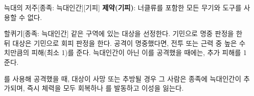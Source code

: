 \documentclass{report}
\begin{document}
	\begin{story}{늑대의 저주}{[종족: 늑대인간][기피]}
		\textbf{제약(기피)}: 너클류를 포함한 모든 무기와 도구를 사용할 수 없다.
		
		\smallskip
		
	\end{story}
	
	\begin{story}{할퀴기}{[종족: 늑대인간]}
		같은 구역에 있는 대상을 선정한다. 기민으로 명중 판정을 한 뒤 대상은 기민으로 회피 판정을 한다. 공격이 명중했다면, 전투 또는 근력 중 높은 수치만큼의 피해(최소 1)를 준다. 늑대인간이 아닌 이를 공격했을 때에는, 추가 피해를 1 준다.
		
		를 사용해 공격했을 때, 대상이 사망 또는 추방될 경우 그 사람은 종족에 늑대인간이 추가되며, 즉시 체력을 모두 회복하나 를 발동하고 이성을 잃는다.
		
		\smallskip
		
	\end{story}
\end{document}
